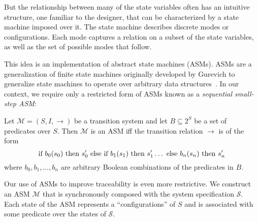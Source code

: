 \documentclass{llncs/llncs}
\newcommand{\ben}[1]{ } %
\newcommand{\ben}[1]{ {\color{purple}$<$ben: #1$>$} } %
\begin{document}

But the relationship between many of the state variables often has an intuitive structure, one familiar to the designer, that can be characterized by a state machine imposed over it. The state machine describes discrete modes or configurations. Each mode captures a relation on a subset of the state variables, as well as the set of possible modes that follow.

This idea is an implementation of abstract state machines (ASMs). ASMs are a generalization of finite state machines originally developed by Gurevich to generalize state machines to operate over arbitrary data structures~\cite{asm}. In our context, we require only a restricted form of ASMs known as a \emph{sequential small-step ASM}:

\begin{definition}
Let $\mathcal{M} = (S, I, \rightarrow)$ be a transition system and let $B \subseteq 2^S$ be a set of predicates over $S$. Then $\mathcal{M}$ is an ASM iff the transition relation $\rightarrow$ is of the form
$$\textnormal{if } b_0(s_0) \textnormal{ then } s'_0 \textnormal{ else if } b_1(s_1) \textnormal{ then } s'_1 \ldots \textnormal{ else } b_n(s_n) \textnormal{ then } s'_n$$
\noindent
where $b_0, b_1, \ldots, b_n$ are arbitrary Boolean combinations of the predicates in $B$.
\end{definition}

\ben{I'm confused by this definition, but I haven't looked at the reference, so maybe it would be clear if I did. My intuitive notion of ASM involves a set of predicates B which *cover* the reachable states and a transition relation over B that abstracts the one over S.}

Our use of ASMs to improve traceability is even more restrictive. We construct an ASM $\mathcal{M}$ that is synchronously composed with the system specification $\mathcal{S}$. Each state of the ASM represents a ``configurations'' of $S$ and is associated with some predicate over the states of $\mathcal{S}$.
\end{document}
